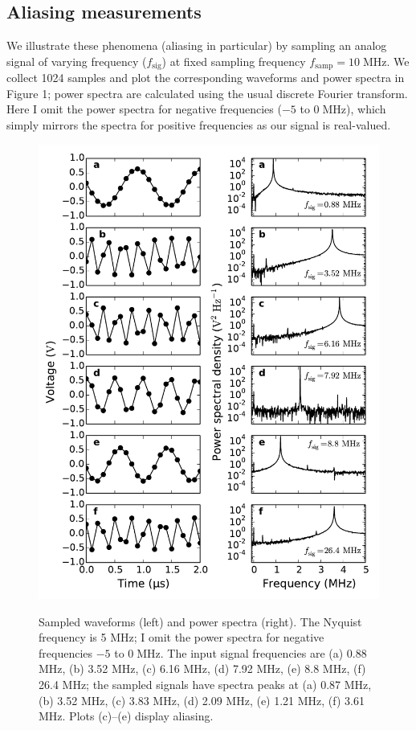 \documentclass[11pt]{article}
\newcommand {\mt}{\mathrm}
\newcommand {\unit}[1]{\; \mt{#1}}
\begin{document}
\subsection{Aliasing measurements}

We illustrate these phenomena (aliasing in particular) by sampling an analog
signal of varying frequency ($f_{\mt{sig}}$) at fixed sampling frequency
$f_{\mt{samp}} = 10 \unit{MHz}$.
We collect 1024 samples and plot the corresponding waveforms and power spectra
in Figure 1; power spectra are calculated using the usual discrete Fourier
transform.
Here I omit the power spectra for negative frequencies ($-5$ to $0
\unit{MHz}$), which simply mirrors the spectra for positive frequencies as our
signal is real-valued.

\newpage
\begin{figure}[!ht]
    \centering
    \includegraphics[scale=0.95]{scripts/nyquist_plots.pdf} \\
    \caption{Sampled waveforms (left) and power spectra (right). The
    Nyquist frequency is 5 MHz; I omit the power spectra for negative
    frequencies $-5$ to $0 \unit{MHz}$.
    The input signal frequencies are (a) 0.88 MHz, (b) 3.52 MHz, (c) 6.16 MHz,
    (d) 7.92 MHz, (e) 8.8 MHz, (f) 26.4 MHz;
    the sampled signals have spectra peaks at (a) 0.87 MHz,
    (b) 3.52 MHz, (c) 3.83 MHz, (d) 2.09 MHz, (e) 1.21 MHz, (f) 3.61 MHz.
    Plots (c)--(e) display aliasing.}
\end{figure}
\newpage
\end{document}
